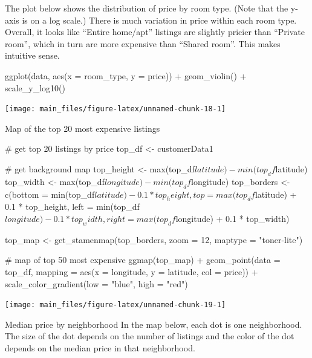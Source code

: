 The plot below shows the distribution of price by room type. (Note that
the y-axis is on a log scale.) There is much variation in price within
each room type. Overall, it looks like ``Entire home/apt'' listings are
slightly pricier than ``Private room'', which in turn are more expensive
than ``Shared room''. This makes intuitive sense.

\begin{Schunk}
\begin{Sinput}
ggplot(data, aes(x = room_type, y = price)) +
    geom_violin() +
    scale_y_log10()
\end{Sinput}


\begin{center}\texttt{[image: main\_files/figure-latex/unnamed-chunk-18-1]} \end{center}

\end{Schunk}

Map of the top 20 most expensive listings

\begin{Schunk}
\begin{Sinput}
# get top 20 listings by price
top_df <- customerData1 %

# get background map
top_height <- max(top_df$latitude) - min(top_df$latitude)
top_width <- max(top_df$longitude) - min(top_df$longitude)
top_borders <- c(bottom  = min(top_df$latitude)  - 0.1 * top_height,
                 top     = max(top_df$latitude)  + 0.1 * top_height,
                 left    = min(top_df$longitude) - 0.1 * top_width,
                 right   = max(top_df$longitude) + 0.1 * top_width)

top_map <- get_stamenmap(top_borders, zoom = 12, maptype = "toner-lite")

# map of top 50 most expensive
ggmap(top_map) +
    geom_point(data = top_df, mapping = aes(x = longitude, y = latitude,
                                        col = price)) +
    scale_color_gradient(low = "blue", high = "red")
\end{Sinput}


\begin{center}\texttt{[image: main\_files/figure-latex/unnamed-chunk-19-1]} \end{center}

\end{Schunk}

Median price by neighborhood In the map below, each dot is one
neighborhood. The size of the dot depends on the number of listings and
the color of the dot depends on the median price in that neighborhood.

